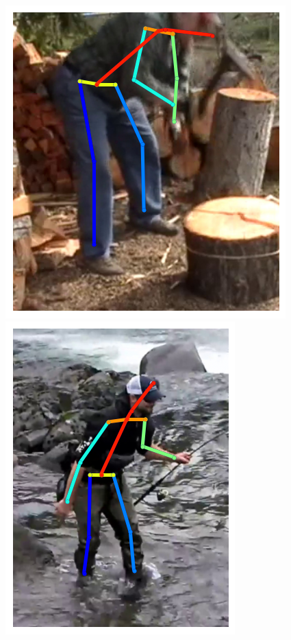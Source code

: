 \begin{figure}[t!]
    \includegraphics[height=\flowhh]{resources/Human_Poses/qualitative/img-6}
    \hfill
    \includegraphics[height=\flowhh]{resources/Human_Poses/qualitative/img-7}
    \hfill

\end{figure}
